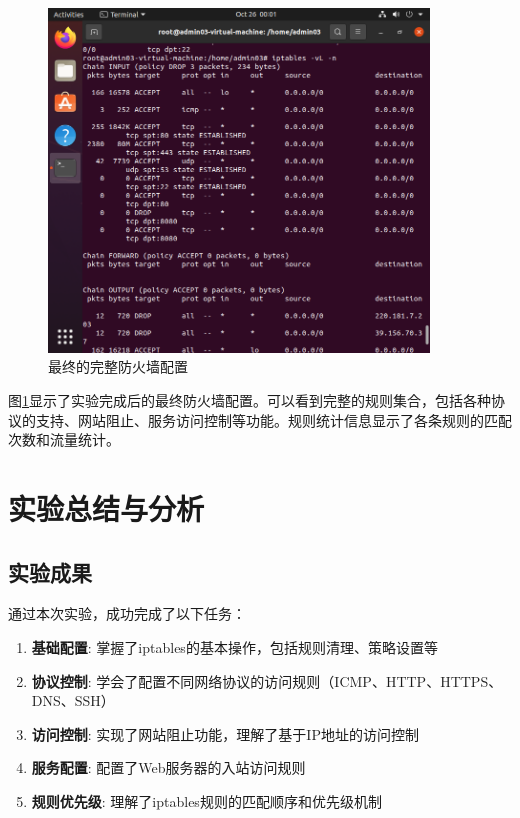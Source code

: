 \documentclass[12pt,a4paper]{article}
\begin{document}
\begin{figure}[H]
    \centering
    \includegraphics[width=0.9\textwidth]{12_final_configuration.png}
    \caption{最终的完整防火墙配置}
    \label{fig:final_configuration}
\end{figure}

图\ref{fig:final_configuration}显示了实验完成后的最终防火墙配置。可以看到完整的规则集合，包括各种协议的支持、网站阻止、服务访问控制等功能。规则统计信息显示了各条规则的匹配次数和流量统计。

\section{实验总结与分析}

\subsection{实验成果}
通过本次实验，成功完成了以下任务：
\begin{enumerate}
    \item \textbf{基础配置}: 掌握了iptables的基本操作，包括规则清理、策略设置等
    \item \textbf{协议控制}: 学会了配置不同网络协议的访问规则（ICMP、HTTP、HTTPS、DNS、SSH）
    \item \textbf{访问控制}: 实现了网站阻止功能，理解了基于IP地址的访问控制
    \item \textbf{服务配置}: 配置了Web服务器的入站访问规则
    \item \textbf{规则优先级}: 理解了iptables规则的匹配顺序和优先级机制
\end{enumerate}
\end{document}

